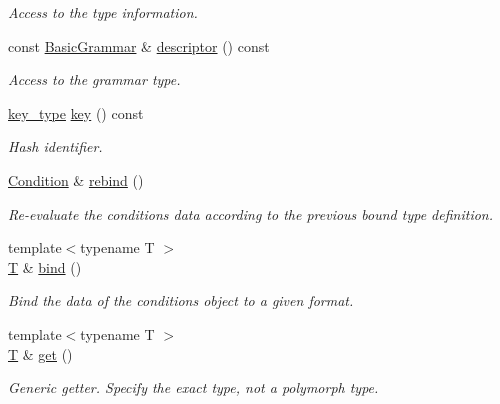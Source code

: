 \begin{DoxyCompactItemize}
\begin{DoxyCompactList}\small\item\em Access to the type information. \end{DoxyCompactList}\item 
const \hyperlink{class_d_d4hep_1_1_basic_grammar}{Basic\+Grammar} \& \hyperlink{class_d_d4hep_1_1_conditions_1_1_condition_a503d8aa496e640f607625cfac506f512}{descriptor} () const
\begin{DoxyCompactList}\small\item\em Access to the grammar type. \end{DoxyCompactList}\item 
\hyperlink{class_d_d4hep_1_1_conditions_1_1_condition_a7528efa762e8cc072ef80ea67c3531f9}{key\+\_\+type} \hyperlink{class_d_d4hep_1_1_conditions_1_1_condition_ac92d0b4c0533bf46b8ae905455a718e7}{key} () const
\begin{DoxyCompactList}\small\item\em Hash identifier. \end{DoxyCompactList}\item 
\hyperlink{class_d_d4hep_1_1_conditions_1_1_condition}{Condition} \& \hyperlink{class_d_d4hep_1_1_conditions_1_1_condition_affc3f86e2c713e2122dabc3372d460f0}{rebind} ()
\begin{DoxyCompactList}\small\item\em Re-\/evaluate the conditions data according to the previous bound type definition. \end{DoxyCompactList}\item 
{\footnotesize template$<$typename T $>$ }\\\hyperlink{class_t}{T} \& \hyperlink{class_d_d4hep_1_1_conditions_1_1_condition_a6f30850ed25383e679d88509c0597211}{bind} ()
\begin{DoxyCompactList}\small\item\em Bind the data of the conditions object to a given format. \end{DoxyCompactList}\item 
{\footnotesize template$<$typename T $>$ }\\\hyperlink{class_t}{T} \& \hyperlink{class_d_d4hep_1_1_conditions_1_1_condition_a3c80bbcbf2b9e5b3c3105309aacf2308}{get} ()
\begin{DoxyCompactList}\small\item\em Generic getter. Specify the exact type, not a polymorph type. \end{DoxyCompactList}\item 

\end{DoxyCompactItemize}
